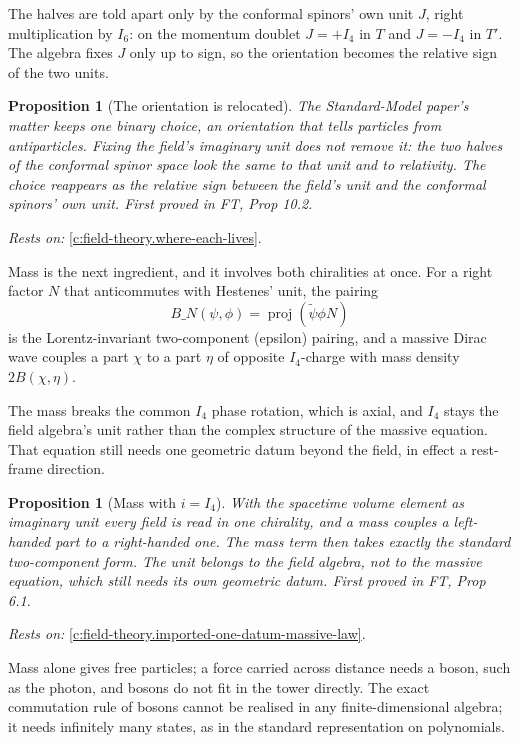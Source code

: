 \documentclass[11pt]{article}
\newtheorem{proposition}[theorem]{Proposition}
\theoremstyle{definition}
\theoremstyle{plain}
\providecommand{\proj}{}\renewcommand{\proj}{\operatorname{proj}}
\begin{document}
The halves are told apart only by the conformal spinors' own unit $J$, right multiplication by $I_6$: on the momentum doublet $J = +I_4$ in $T$ and $J = -I_4$ in $T'$. The algebra fixes $J$ only up to sign, so the orientation becomes the relative sign of the two units.

\begin{proposition}[The orientation is relocated]\label{c:field-theory.orientation-relocated}
The Standard-Model paper's matter keeps one binary choice, an orientation that tells particles from antiparticles. Fixing the field's imaginary unit does not remove it: the two halves of the conformal spinor space look the same to that unit and to relativity. The choice reappears as the relative sign between the field's unit and the conformal spinors' own unit.
\emph{First proved in} FT, Prop 10.2.
\end{proposition}
\noindent\emph{Rests on:} \ref{c:field-theory.where-each-lives}.

Mass is the next ingredient, and it involves both chiralities at once. For a right factor $N$ that anticommutes with Hestenes' unit, the pairing \[ B\_N(\psi, \phi) = \proj(\tilde\psi\phi N) \] is the Lorentz-invariant two-component (epsilon) pairing, and a massive Dirac wave couples a part $\chi$ to a part $\eta$ of opposite $I_4$-charge with mass density $2B(\chi, \eta)$.

The mass breaks the common $I_4$ phase rotation, which is axial, and $I_4$ stays the field algebra's unit rather than the complex structure of the massive equation. That equation still needs one geometric datum beyond the field, in effect a rest-frame direction.

\begin{proposition}[Mass with $i = I_4$]\label{c:field-theory.mass}
With the spacetime volume element as imaginary unit every field is read in one chirality, and a mass couples a left-handed part to a right-handed one. The mass term then takes exactly the standard two-component form. The unit belongs to the field algebra, not to the massive equation, which still needs its own geometric datum.
\emph{First proved in} FT, Prop 6.1.
\end{proposition}
\noindent\emph{Rests on:} \ref{c:field-theory.imported-one-datum-massive-law}.

Mass alone gives free particles; a force carried across distance needs a boson, such as the photon, and bosons do not fit in the tower directly. The exact commutation rule of bosons cannot be realised in any finite-dimensional algebra; it needs infinitely many states, as in the standard representation on polynomials.
\end{document}
